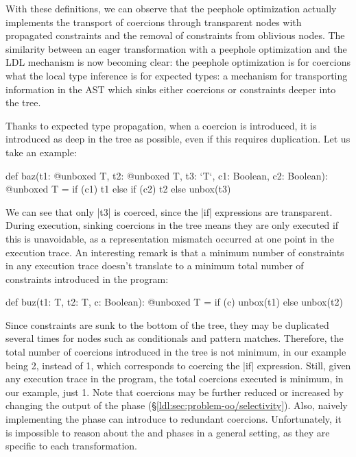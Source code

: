 With these definitions, we can observe that the peephole optimization actually implements the transport of coercions through transparent nodes with propagated constraints and the removal of constraints from oblivious nodes. The similarity between an eager transformation with a peephole optimization and the LDL mechanism is now becoming clear: the peephole optimization is for coercions what the local type inference is for expected types: a mechanism for transporting information in the AST which sinks either coercions or constraints deeper into the tree.

Thanks to expected type propagation, when a coercion is introduced, it is introduced as deep in the tree as possible, even if this requires duplication. Let us take an example:

\begin{lstlisting-nobreak}
 def baz(t1: @unboxed T, t2: @unboxed T, t3: `T`, c1: Boolean, c2: Boolean): @unboxed T =
   if (c1)
     t1
   else
     if (c2)
       t2
     else
       unbox(t3)
\end{lstlisting-nobreak}

We can see that only |t3| is coerced, since the |if| expressions are transparent. During execution, sinking coercions in the tree means they are only executed if this is unavoidable, as a representation mismatch occurred at one point in the execution trace. An interesting remark is that a minimum number of constraints in any execution trace doesn't translate to a minimum total number of constraints introduced in the program:

\begin{lstlisting-nobreak}
def buz(t1: T, t2: T, c: Boolean): @unboxed T =
  if (c)
    unbox(t1)
  else
    unbox(t2)
\end{lstlisting-nobreak}

Since constraints are sunk to the bottom of the tree, they may be duplicated several times for nodes such as conditionals and pattern matches. Therefore, the total number of coercions introduced in the tree is not minimum, in our example being 2, instead of 1, which corresponds to coercing the |if| expression. Still, given any execution trace in the program, the total coercions executed is minimum, in our example, just 1. Note that coercions may be further reduced or increased by changing the output of the \inject{} phase (\S\ref{ldl:sec:problem-oo/selectivity}). Also, naively implementing the \commit{} phase can introduce to redundant coercions. Unfortunately, it is impossible to reason about the \inject{} and \commit{} phases in a general setting, as they are specific to each transformation.

